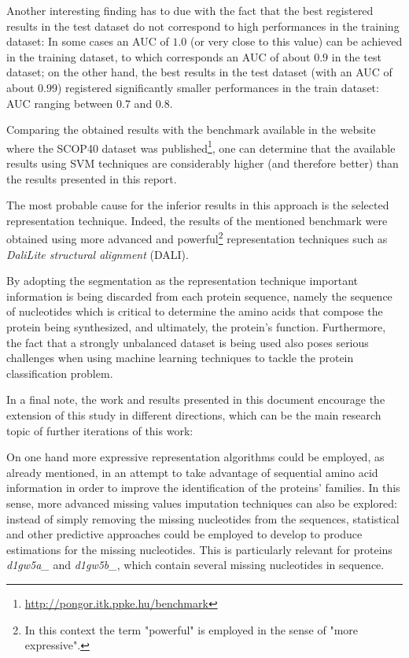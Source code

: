 \documentclass[11pt]{article}
\begin{document}
Another interesting finding has to due with the fact that the best registered results in the test dataset do not correspond to high performances in the training dataset: In some cases an AUC of $1.0$ (or very close to this value) can be achieved in the training dataset, to which corresponds an AUC of about $0.9$ in the test dataset; on the other hand, the best results in the test dataset (with an AUC of about $0.99$) registered significantly smaller performances in the train dataset: AUC ranging between $0.7$ and $0.8$.

Comparing the obtained results with the benchmark available in the website where the SCOP40 dataset was published\footnote{\url{http://pongor.itk.ppke.hu/benchmark}}, one can determine that the available results using SVM techniques are considerably higher (and therefore better) than the results presented in this report.

The most probable cause for the inferior results in this approach is the selected representation technique. Indeed, the results of the mentioned benchmark were obtained using more advanced and powerful\footnote{In this context the term "powerful" is employed in the sense of "more expressive".} representation techniques such as \emph{DaliLite structural alignment} (DALI).

By adopting the segmentation as the representation technique important information is being discarded from each protein sequence, namely the sequence of nucleotides which is critical to determine the amino acids that compose the protein being synthesized, and ultimately, the protein's function. Furthermore, the fact that a strongly unbalanced dataset is being used also poses serious challenges when using machine learning techniques to tackle the protein classification problem.

In a final note, the work and results presented in this document encourage the extension of this study in different directions, which can be the main research topic of further iterations of this work:

On one hand more expressive representation algorithms could be employed, as already mentioned, in an attempt to take advantage of sequential amino acid information in order to improve the identification of the proteins' families. In this sense, more advanced missing values imputation techniques can also be explored: instead of simply removing the missing nucleotides from the sequences, statistical and other predictive approaches could be employed to develop to produce estimations for the missing nucleotides. This is particularly relevant for proteins \emph{d1gw5a\_} and \emph{d1gw5b\_}, which contain several missing nucleotides in sequence.
\end{document}
